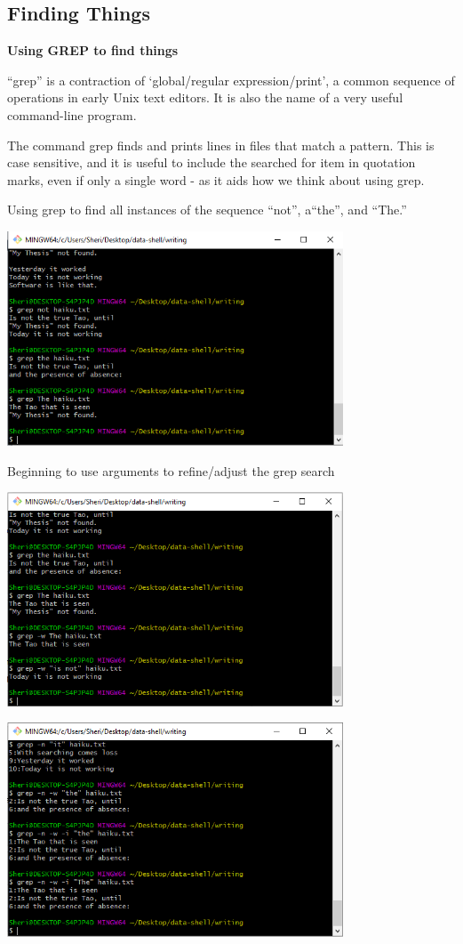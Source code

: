 \documentclass{article}
\begin{document}
\subsection{Finding Things}

\textbf{Using GREP to find things}
 
 ``grep'' is a contraction of ‘global/regular expression/print’, a common sequence of operations in early Unix text editors. It is also the name of a very useful command-line program.
 
The command grep finds and prints lines in files that match a pattern. 
This is case sensitive, and it is useful to include the searched for item in quotation marks, even if only a single word - as it aids how we think about using grep.

Using grep to find all instances of the sequence ``not'', a``the'', and ``The.''


\includegraphics[width=10cm]{Images/GitBash_061.PNG}

Beginning to use arguments to refine/adjust the grep search

\includegraphics[width=10cm]{Images/GitBash_062.PNG}

\includegraphics[width=10cm]{Images/GitBash_063.PNG}
\end{document}

